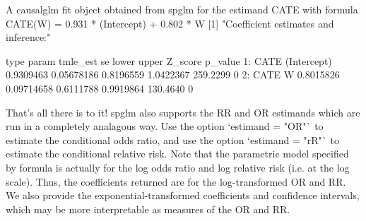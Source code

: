 \documentclass{article}
\begin{document}
\begin{Schunk}
\begin{Soutput}
A causalglm fit object obtained from spglm for the estimand CATE with formula 
CATE(W) = 0.931 * (Intercept) + 0.802 * W
[1] "Coefficient estimates and inference:"

   type       param  tmle_est         se     lower     upper  Z_score p_value
1: CATE (Intercept) 0.9309463 0.05678186 0.8196559 1.0422367 259.2299       0
2: CATE           W 0.8015826 0.09714658 0.6111788 0.9919864 130.4640       0
\end{Soutput}
\end{Schunk}



That's all there is to it! spglm also supports the RR and OR estimands which are run in a completely analagous way. Use the option `estimand = "OR"` to estimate the conditional odds ratio, and use the option `estimand = "rR"` to estimate the conditional relative risk. Note that the parametric model specified by formula is actually for the log odds ratio and log relative risk (i.e. at the log scale). Thus, the coefficients returned are for the log-transformed OR and RR. We also provide the exponential-transformed coefficients and confidence intervals, which may be more interpretable as measures of the OR and RR.
\end{document}
